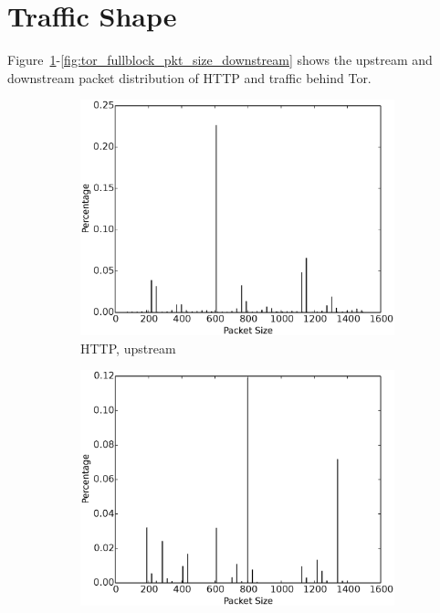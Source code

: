 \section{\bc Traffic Shape}\label{sec:bcshape}

Figure~\ref{fig:tor_reg_traffic_pkt_size_upstream}-\ref{fig:tor_fullblock_pkt_size_downstream} shows the upstream and downstream packet distribution of HTTP and \bc traffic behind Tor.
\begin{figure}[t]
\begin{subfigure}{0.48\linewidth}
\centering
\includegraphics[width=\linewidth]{image/tor_reg_traffic_pkt_size_upstream.eps}
\caption{HTTP, upstream}
\label{fig:tor_reg_traffic_pkt_size_upstream}
\end{subfigure}
\begin{subfigure}{0.48\linewidth}
\centering
\includegraphics[width=\linewidth]{image/tor_reg_traffic_pkt_size_downstream.eps}

\end{subfigure}
\end{figure}
